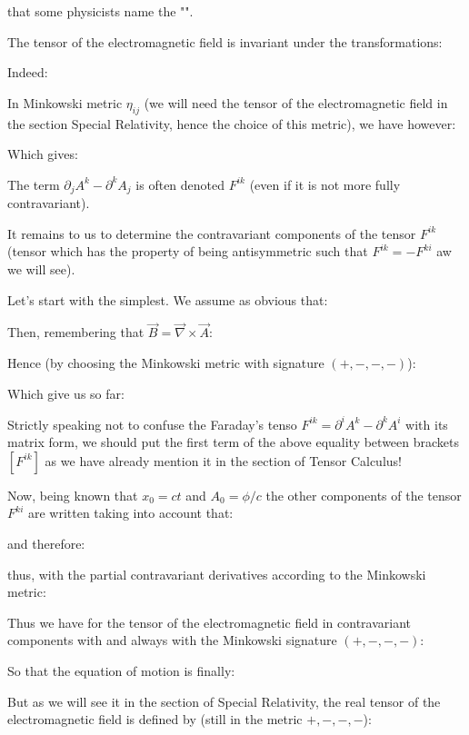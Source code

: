 	that some physicists name the "".	
	\begin{tcolorbox}	[title=Remark,colframe=black,arc=10pt]
	The tensor of the electromagnetic field is invariant under the transformations:
	
	Indeed:
	
	\end{tcolorbox}
	In Minkowski metric $\eta_{ij}$ (we will need the tensor of the electromagnetic field in the section Special Relativity, hence the choice of this metric), we have however:
	
	Which gives:
	
	The term $\partial_jA^k-\partial^k A_j$ is often denoted $F^{ik}$ (even if it is not more fully contravariant).

	It remains to us to determine the contravariant components of the tensor $F^{ik}$ (tensor which has the property of being antisymmetric such that $F^{ik}=-F^{ki}$ aw we will see).

	Let's start with the simplest. We assume as obvious that:
	
	Then, remembering that $\vec{B}=\vec{\nabla}\times\vec{A}$:
	
	Hence (by choosing the Minkowski metric with signature $(+, -, -, -)$):
	
	Which give us so far:
	
	\begin{tcolorbox}[title=Remark,colframe=black,arc=10pt]
	Strictly speaking not to confuse the Faraday's tenso $F^{ik}=\partial^iA^k-\partial^kA^i$ with its matrix form, we should put the first term of the above equality between brackets $[F^{ik}]$ as we have already mention it in the section of Tensor Calculus!
	\end{tcolorbox}
	Now, being known that $x_0=ct$ and $A_0=\phi/c$ the other components of the tensor $F^{ki}$ are written taking into account that:
	
	and therefore:
	
	thus, with the partial contravariant  derivatives according to the Minkowski metric:
	
	Thus we have for the tensor of the electromagnetic field in contravariant components with and always with the Minkowski signature $(+, -, -, -)$:
	
	So that the equation of motion is finally:
	
	But as we will see it in the section of Special Relativity, the real tensor of the electromagnetic field is defined by (still in the metric $+, -, -, -$):	
	
